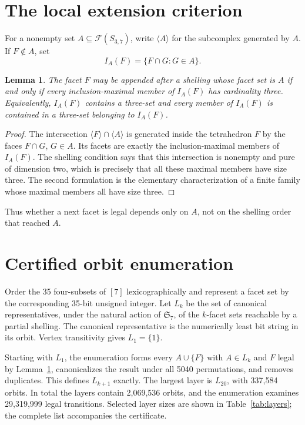 \documentclass[11pt]{article}
\newtheorem{lemma}{Lemma}
\newcommand{\fac}{\mathcal F}
\begin{document}
\section{The local extension criterion}
For a nonempty set $A\subseteq\fac(S_{3,7})$, write $\langle A\rangle$ for the subcomplex generated by $A$. If $F\notin A$, set
\[ I_A(F)=\{F\cap G:G\in A\}. \]

\begin{lemma}\label{lem:local}
The facet $F$ may be appended after a shelling whose facet set is $A$ if and only if every inclusion-maximal member of $I_A(F)$ has cardinality three. Equivalently, $I_A(F)$ contains a three-set and every member of $I_A(F)$ is contained in a three-set belonging to $I_A(F)$.
\end{lemma}
\begin{proof}
The intersection $\langle F\rangle\cap\langle A\rangle$ is generated inside the tetrahedron $F$ by the faces $F\cap G$, $G\in A$. Its facets are exactly the inclusion-maximal members of $I_A(F)$. The shelling condition says that this intersection is nonempty and pure of dimension two, which is precisely that all these maximal members have size three. The second formulation is the elementary characterization of a finite family whose maximal members all have size three.
\end{proof}
Thus whether a next facet is legal depends only on $A$, not on the shelling order that reached $A$.

\section{Certified orbit enumeration}
Order the 35 four-subsets of $[7]$ lexicographically and represent a facet set by the corresponding 35-bit unsigned integer. Let $L_k$ be the set of canonical representatives, under the natural action of $\mathfrak S_7$, of the $k$-facet sets reachable by a partial shelling. The canonical representative is the numerically least bit string in its orbit. Vertex transitivity gives $L_1=\{1\}$.

Starting with $L_1$, the enumeration forms every $A\cup\{F\}$ with $A\in L_k$ and $F$ legal by Lemma~\ref{lem:local}, canonicalizes the result under all 5040 permutations, and removes duplicates. This defines $L_{k+1}$ exactly. The largest layer is $L_{20}$, with 337,584 orbits. In total the layers contain 2,069,536 orbits, and the enumeration examines 29,319,999 legal transitions. Selected layer sizes are shown in Table~\ref{tab:layers}; the complete list accompanies the certificate.
\end{document}
